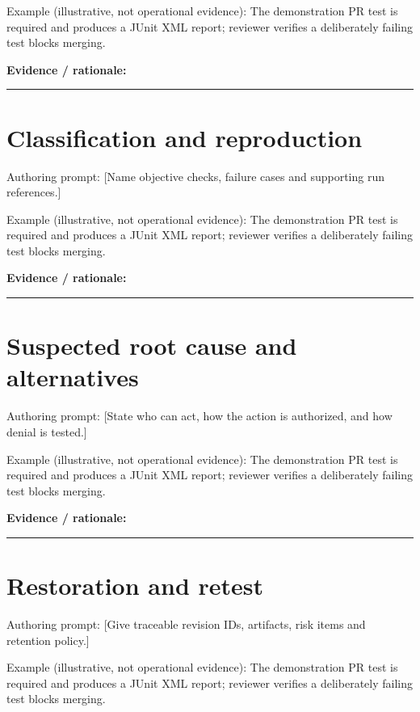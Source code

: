 \documentclass[11pt,letterpaper]{article}
\begin{document}
Example (illustrative, not operational evidence): The demonstration PR test is required and produces a JUnit XML report; reviewer verifies a deliberately failing test blocks merging.

\noindent\textbf{Evidence / rationale:}\par\nobreak\vspace{8pt}\noindent\rule{0.93\linewidth}{0.4pt}\par\vspace{14pt}
\section{Classification and reproduction}
Authoring prompt: [Name objective checks, failure cases and supporting run references.]

Example (illustrative, not operational evidence): The demonstration PR test is required and produces a JUnit XML report; reviewer verifies a deliberately failing test blocks merging.

\noindent\textbf{Evidence / rationale:}\par\nobreak\vspace{8pt}\noindent\rule{0.93\linewidth}{0.4pt}\par\vspace{14pt}
\section{Suspected root cause and alternatives}
Authoring prompt: [State who can act, how the action is authorized, and how denial is tested.]

Example (illustrative, not operational evidence): The demonstration PR test is required and produces a JUnit XML report; reviewer verifies a deliberately failing test blocks merging.

\noindent\textbf{Evidence / rationale:}\par\nobreak\vspace{8pt}\noindent\rule{0.93\linewidth}{0.4pt}\par\vspace{14pt}
\section{Restoration and retest}
Authoring prompt: [Give traceable revision IDs, artifacts, risk items and retention policy.]

Example (illustrative, not operational evidence): The demonstration PR test is required and produces a JUnit XML report; reviewer verifies a deliberately failing test blocks merging.
\end{document}
